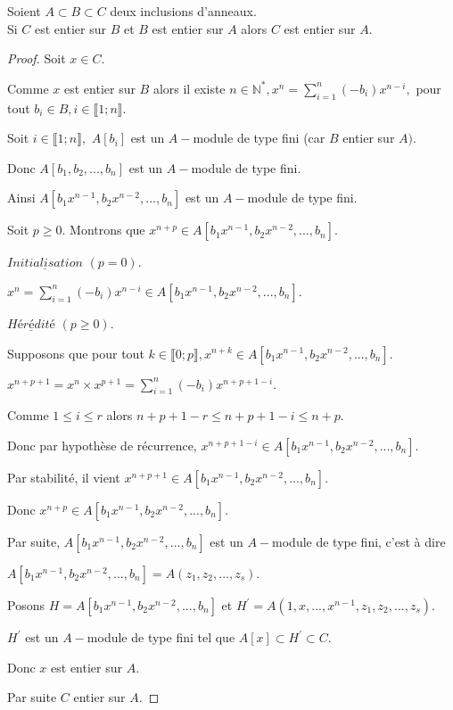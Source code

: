 \begin{moncorollaire}
	Soient $A \subset B \subset C $ deux inclusions d'anneaux.\\
	Si $C$ est entier sur $B$ et $B$ est entier sur $A$ alors $C$ est entier sur $A$.
\end{moncorollaire}
\begin{proof}
	Soit $x\in C.$
	
	Comme $x$ est entier sur $B$ alors il existe $n\in \mathbb{N}^{\ast },x^{n}=\sum\limits_{i=1}^{n}(-b_{i})x^{n-i},$ pour tout $b_{i}\in
	B,i\in \llbracket 1; n \rrbracket.$
	
	Soit $i\in \llbracket 1; n \rrbracket,$ $A[b_{i}]$ est un $A-$module de type fini
	(car $B$ entier sur $A).$
	
	Donc $A[b_{1},b_{2},...,b_{n}]$ est un $A-$module de type fini.
	
	Ainsi $A[b_{1}x^{n-1},b_{2}x^{n-2},...,b_{n}]$ est un $A-$module de type
	fini.
	
	Soit $p\geq 0.$ Montrons que $x^{n+p}\in
	A[b_{1}x^{n-1},b_{2}x^{n-2},...,b_{n}].$
	
	$\underline{Initialisation}$ $(p=0).$
	
	$x^{n}=\sum\limits_{i=1}^{n}(-b_{i})x^{n-i}\in
	A[b_{1}x^{n-1},b_{2}x^{n-2},...,b_{n}].$
	
	$\underline{Hérédité}$ $(p\geq 0)$.
	
	Supposons que pour tout $k\in \llbracket 0; p \rrbracket,x^{n+k}\in
	A[b_{1}x^{n-1},b_{2}x^{n-2},...,b_{n}].$
	
	$x^{n+p+1}=x^{n}\times x^{p+1}=\sum\limits_{i=1}^{n}(-b_{i})x^{n+p+1-i}.$
	
	Comme $1\leq i\leq r$ alors $n+p+1-r\leq n+p+1-i\leq n+p.$
	
	Donc par hypothèse de récurrence, $x^{n+p+1-i}\in
	A[b_{1}x^{n-1},b_{2}x^{n-2},...,b_{n}].$
	
	Par stabilité, il vient $x^{n+p+1}\in
	A[b_{1}x^{n-1},b_{2}x^{n-2},...,b_{n}].$
	
	Donc $x^{n+p}\in A[b_{1}x^{n-1},b_{2}x^{n-2},...,b_{n}].$
	
	Par suite, $A[b_{1}x^{n-1},b_{2}x^{n-2},...,b_{n}]$ est un $A-$module de
	type fini, c'est à dire 
	
	$A[b_{1}x^{n-1},b_{2}x^{n-2},...,b_{n}]=A(z_{1},z_{2},...,z_{s}).$
	
	Posons $H=A[b_{1}x^{n-1},b_{2}x^{n-2},...,b_{n}]$ et $H^{\prime
	}=A(1,x,...,x^{n-1},z_{1},z_{2},...,z_{s})$.
	
	$H^{\prime }$ est un $A-$module de type fini tel que $A[x]\subset H^{\prime
	}\subset C.$
	
	Donc $x$ est entier sur $A.$
	
	Par suite $C$ entier sur $A.$
\end{proof}

